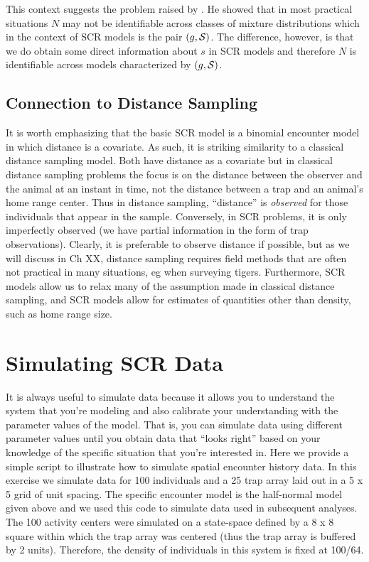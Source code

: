 This context suggests the problem raised by \citet{link:2003}. He showed that in most practical situations $N$ may not be identifiable across classes of mixture distributions which in the context of SCR models is the pair $(g, {\cal S})$.  The difference, however, is that we do obtain some direct information about $s$ in SCR models and therefore $N$ is identifiable across models characterized by $(g,{\cal S})$.

\subsection{Connection to Distance Sampling}
It is worth emphasizing that the basic SCR model is a binomial encounter model in which distance is a covariate. As such, it is striking similarity to a classical distance sampling model. Both have distance as a covariate but in classical distance sampling problems the focus is on the distance between the observer and the animal at an instant in time, not the distance between a trap and an animal's home range center. Thus in distance sampling, ``distance'' is {\it observed} for those individuals that appear in the sample. Conversely, in SCR problems, it is only imperfectly observed (we have partial information in the form of trap observations).  Clearly, it is preferable to observe distance if possible, but as we will discuss in Ch XX, distance sampling requires field methods that are often not practical in many situations, eg when surveying tigers. Furthermore, SCR models allow us to relax many of the assumption made in classical distance sampling, and SCR models allow for estimates of quantities other than density, such as home range size. 


\section{Simulating SCR Data}
It is always useful to simulate data because it allows you to understand the system that you're modeling and also calibrate your understanding with the parameter values of the model. That is, you can simulate data using different parameter values until you obtain data that ``looks right'' based on your knowledge of the specific situation that you're interested in. Here we provide a simple script to illustrate how to simulate spatial encounter history data. In this exercise we simulate data for 100 individuals and a 25 trap array laid out in a 5 x 5 grid of unit spacing.  The specific encounter model is the half-normal model given above and we used this code to simulate data used in subsequent analyses.  The 100 activity centers were simulated on a state-space defined by a 8 x 8 square within which the trap array was centered (thus the trap array is buffered by 2 units). Therefore, the density of individuals in this system is fixed at 100/64. 

